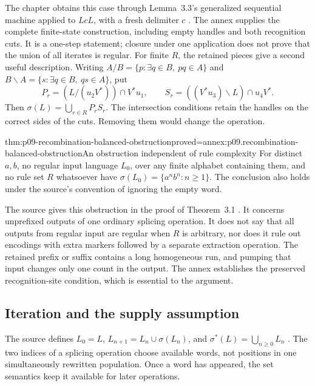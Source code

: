 The chapter obtains this case through Lemma~3.3's generalized sequential
machine applied to \(LcL\), with a fresh delimiter \(c\)
\cite[pp.~300--301]{HeadPaunPixton1997RecombinationIntake}.
The annex supplies the complete finite-state construction, including empty
handles and both recognition cuts. It is a one-step statement; closure under
one application does not prove that the union of all iterates is regular.
For finite \(R\), the retained pieces give a second useful description.
Writing \(A/B=\{p:\exists q\in B,\ pq\in A\}\) and
\(B\backslash A=\{s:\exists q\in B,\ qs\in A\}\), put
\[
 P_r=(L/(u_2V^*))\cap V^*u_1,\qquad
 S_r=((V^*u_3)\backslash L)\cap u_4V^*.
\]
Then \(\sigma(L)=\bigcup_{r\in R}P_rS_r\). The intersection conditions
retain the handles on the correct sides of the cuts. Removing them would
change the operation.

\begin{hbtheorem}{thm:p09-recombination-balanced-obstruction}{proved=annex:p09.recombination-balanced-obstruction}{An obstruction independent of rule complexity}
For distinct \(a,b\), no regular input language \(L_0\), over any finite
alphabet containing them, and no rule set \(R\) whatsoever have
\(\sigma(L_0)=\{a^nb^n:n\geq1\}\).
The conclusion also holds under the source's convention of ignoring the
empty word.
\end{hbtheorem}

The source gives this obstruction in the proof of Theorem~3.1
\cite[p.~304]{HeadPaunPixton1997RecombinationIntake}.
It concerns unprefixed outputs of one ordinary splicing operation.
It does not say that all outputs from regular input are regular when \(R\)
is arbitrary, nor does it rule out encodings with extra markers followed by
a separate extraction operation. The retained prefix or suffix contains a
long homogeneous run, and pumping that input changes only one count in the
output. The annex establishes the preserved recognition-site condition,
which is essential to the argument.

\subsection{Iteration and the supply assumption}
\label{sec:p09-recombination-iteration}

The source defines \(L_0=L\), \(L_{n+1}=L_n\cup\sigma(L_n)\), and
\(\sigma^*(L)=\bigcup_{n\geq0}L_n\)
\cite[p.~306]{HeadPaunPixton1997RecombinationIntake}.
The two indices of a splicing operation choose available words, not positions
in one simultaneously rewritten population. Once a word has appeared, the
set semantics keep it available for later operations.

